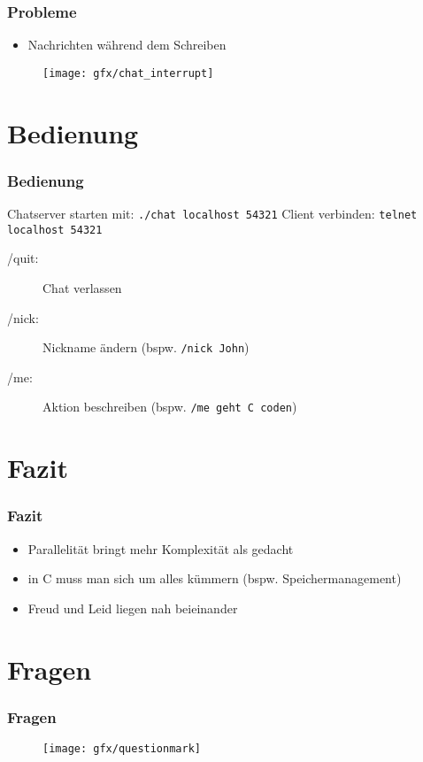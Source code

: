 \documentclass[12pt]{beamer}
\begin{document}
    \begin{frame}
	\frametitle{Probleme} 
	\begin{itemize}
	    \item Nachrichten während dem Schreiben
	\end{itemize}

	\begin{figure}[H]
	    \centering
	    \texttt{[image: gfx/chat\_interrupt]}
	    \label{img:chat_interrupt}
	\end{figure}
    \end{frame}

    \section{Bedienung}
    \begin{frame}
        \frametitle{Bedienung}
	Chatserver starten mit: \texttt{./chat localhost 54321}
	\bigskip
	Client verbinden: \texttt{telnet localhost 54321}
	\begin{description}
	    \item[/quit:] Chat verlassen
	    \item[/nick:] Nickname ändern \newline (bspw. \texttt{/nick John})
	    \item[/me:] Aktion beschreiben \newline (bspw. \texttt{/me geht C coden})
	\end{description}
    \end{frame}

    \section{Fazit}
    \begin{frame}
    \frametitle{Fazit}
	\begin{itemize}
	    \item Parallelität bringt mehr Komplexität als gedacht
	    \item in C muss man sich um alles kümmern (bspw. Speichermanagement)
	    \item Freud und Leid liegen nah beieinander
	\end{itemize}
    \end{frame}

    \section{Fragen}
    \begin{frame}
    \frametitle{Fragen}
        \begin{figure}[H]
	    \centering
	        \texttt{[image: gfx/questionmark]}
        \end{figure}
    \end{frame}
\end{document}
